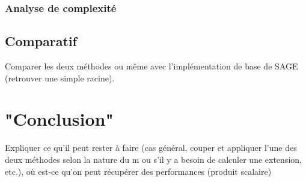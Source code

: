 \documentclass[a4paper]{article} %
\numberwithin{equation}{section}
\begin{document}
\subsubsection{Analyse de complexité}
\subsection{Comparatif}
Comparer les deux méthodes ou même avec l'implémentation de base de SAGE 
(retrouver une simple racine).
\section{"Conclusion"}
Expliquer ce qu'il peut rester à faire (cas général, couper et appliquer 
l'une des deux méthodes selon la nature du m ou s'il y a besoin de calculer 
une extension, etc.), où est-ce qu'on peut récupérer des performances 
(produit scalaire)
\end{document}
